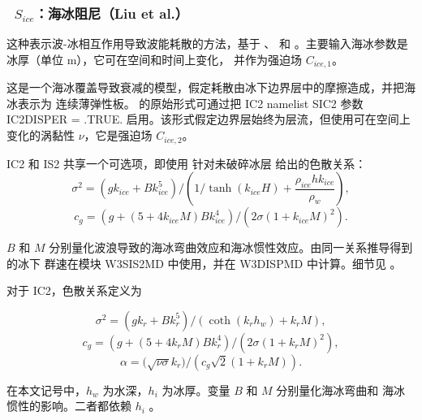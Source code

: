 \vsssub
\subsubsection{~$S_{ice}$：海冰阻尼（Liu et al.）} \label{sec:ICE2}
\vsssub


\noindent
这种表示波-冰相互作用导致波能耗散的方法，基于 \cite{art:LMC88}、\cite{art:LHV91}
和 \cite{art:Aea15}。主要输入海冰参数是冰厚（单位 m），它可在空间和时间上变化，
并作为强迫场 ${C_{ice,1}}$。

这是一个海冰覆盖导致衰减的模型，假定耗散由冰下边界层中的摩擦造成，并把海冰表示为
连续薄弹性板。\cite{art:LMC88} 的原始形式可通过把 {\code IC2} namelist {\F SIC2}
参数 {\code IC2DISPER = .TRUE.} 启用。该形式假定边界层始终为层流，但使用可在空间上
变化的涡黏性 ${\nu}$，它是强迫场 ${C_{ice,2}}$。

{\code IC2} 和 {\code IS2} 共享一个可选项，即使用 \cite{art:LMC88} 针对未破碎冰层
给出的色散关系：
\begin{equation}
\sigma^2 =  \left(gk_{ice} + B k_{ice}^5\right)  / \left(1/\tanh ( k_{ice}H) +\frac{\rho_{ice}  h k_{ice}} {\rho_{w} }\right),
\end{equation}
\begin{equation}
c_g =  (g+(5 + 4 k_{ice} M)Bk_{ice}^4)/(2\sigma(1+k_{ice}M)^2).
\end{equation}

\noindent
$B$ 和 $M$ 分别量化波浪导致的海冰弯曲效应和海冰惯性效应。由同一关系推导得到的冰下
群速在模块 {\code W3SIS2MD} 中使用，并在 {\code W3DISPMD} 中计算。细节见
\citet{art:LMC88}。

对于 {\code IC2}，色散关系定义为

\begin{equation}\label{eq:ice1}
  {\sigma}^2 = ({gk_r} + {Bk_r^5})/(\coth({k_r}{h_w}) + {k_r}{M}),
\end{equation}
\begin{equation}\label{eq:ice2}
  {c_g} = (g + (5 + 4{k_r}{M}){B}{k_r^4})/(2{\sigma}(1+{k_r}{M})^2),
\end{equation}
\begin{equation}\label{eq:ice3}
  {\alpha} = (\sqrt{{\nu\sigma}}{k_r)}/({c_g}\sqrt{2}(1+{k_r}{M})).
\end{equation}

\noindent
在本文记号中，$h_w$ 为水深，$h_i$ 为冰厚。变量 $B$ 和 $M$ 分别量化海冰弯曲和
海冰惯性的影响。二者都依赖 $h_i$ \citep[见][]{art:LMC88, art:LHV91}。

